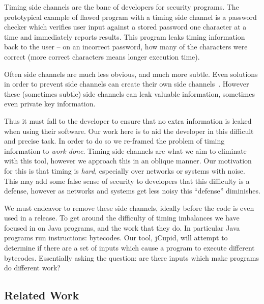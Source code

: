 Timing side channels are the bane of developers for security programs. The prototypical example of flawed program with a timing side channel is a password checker which verifies user input against a stored password one character at a time and immediately reports results. This program leaks timing information back to the user -- on an incorrect password, how many of the characters were correct (more correct characters means longer execution time).

Often side channels are much less obvious, and much more subtle. Even solutions in order to prevent side channels can create their own side channels~\cite{al2013lucky}. However these (sometimes subtle) side channels can leak valuable information, sometimes even private key information.

Thus it must fall to the developer to ensure that no extra information is leaked when using their software. Our work here is to aid the developer in this difficult and precise task. In order to do so we re-framed the problem of timing information to \emph{work done}. Timing side channels are what we aim to eliminate with this tool, however we approach this in an oblique manner. Our motivation for this is that timing is \emph{hard}, especially over networks or systems with noise. This may add some false sense of security to developers that this difficulty is a defense, however as networks and systems get less noisy this ``defense'' diminishes.

We must endeavor to remove these side channels, ideally before the code is even used in a release. To get around the difficulty of timing imbalances we have focused in on Java programs, and the work that they do. In particular Java programs run instructions: bytecodes. Our tool, jCupid, will attempt to determine if there are a set of inputs which cause a program to execute different bytecodes. Essentially asking the question: are there inputs which make programs do different work?


\subsection{Related Work}

